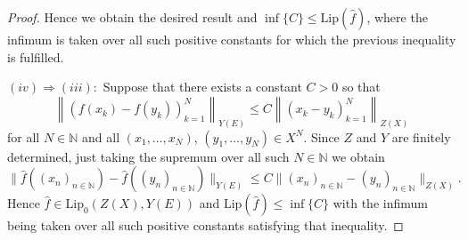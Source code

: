 \documentclass[12pt]{amsart}
\def\N{\mathbb{N}}
\def\Lip{\mathrm{Lip}_0}
\def\Lipnorm{\mathrm{Lip}}
\begin{document}
\begin{proof}
	Hence we obtain the desired result and $\inf\{C\} \leq \Lipnorm(\hat{f})$, where the infimum is taken over all such positive constants for which the previous inequality is fulfilled.

	$(iv) \Rightarrow (iii):$ Suppose that there exists a constant $C>0$ so that
	$$
	\left\|(f(x_k)-f(y_k))_{k=1}^N\right\|_{Y(E)} \leq C\left\|(x_k-y_k)_{k=1}^N\right\|_{Z(X)}
	$$
	for all $N\in\N$ and all $(x_1,\ldots,x_N)$, $(y_1,\ldots,y_N)\in X^N$. Since $Z$ and $Y$ are finitely determined, just taking the supremum over all such $N\in\N$ we obtain
	$$
	\|\hat{f}((x_n)_{n\in\N})-\hat{f}((y_n)_{n\in\N})\|_{Y(E)} \leq C\|(x_n)_{n\in\N}-(y_n)_{n\in\N}\|_{Z(X)}.
	$$
	Hence $\hat{f} \in \Lip(Z(X),Y(E))$ and $\Lipnorm(\hat{f}) \leq \inf\{C\}$ with the infimum being taken over all such positive constants satisfying that inequality.
\end{proof}
\end{document}
